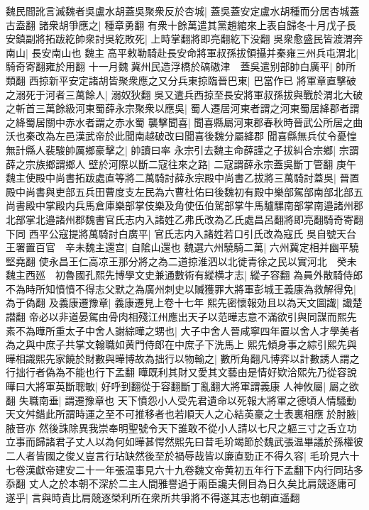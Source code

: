 魏民間訛言滅魏者吳盧水胡蓋吳聚衆反於杏城|{
	蓋吳蓋安定盧水胡種而分居杏城蓋古盍翻}
諸衆胡爭應之|{
	種章勇翻}
有衆十餘萬遣其黨趙綰來上表自歸冬十月戊子長安鎮副將拓跋紇帥衆討吳紇敗死|{
	上時掌翻將即亮翻紇下没翻}
吳衆愈盛民皆渡渭奔南山|{
	長安南山也}
魏主高平敕勒騎赴長安命將軍叔孫拔領攝并秦雍三州兵屯渭北|{
	騎奇寄翻雍於用翻}
十一月魏冀州民造浮橋於碻磝津　蓋吳遣别部帥白廣平|{
	帥所類翻}
西掠新平安定諸胡皆聚衆應之又分兵東掠臨晉巴東|{
	巴當作已}
將軍章直擊破之溺死于河者三萬餘人|{
	溺奴狄翻}
吳又遣兵西掠至長安將軍叔孫拔與戰於渭北大破之斬首三萬餘級河東蜀薛永宗聚衆以應吳|{
	蜀人遷居河東者謂之河東蜀居絳郡者謂之絳蜀居關中赤水者謂之赤水蜀}
襲擊聞喜|{
	聞喜縣屬河東郡春秋時晉武公所居之曲沃也秦改為左邑漢武帝於此聞南越破改曰聞喜後魏分屬絳郡}
聞喜縣無兵仗令憂惶無計縣人裴駿帥厲鄉豪擊之|{
	帥讀曰率}
永宗引去魏主命薛謹之子拔糾合宗鄉|{
	宗謂薛之宗族鄉謂鄉人}
壁於河際以斷二寇往來之路|{
	二寇謂薛永宗蓋吳斷丁管翻}
庚午魏主使殿中尚書拓跋處直等將二萬騎討薛永宗殿中尚書乙拔將三萬騎討蓋吳|{
	晉置殿中尚書與吏部五兵田曹度支左民為六曹杜佑曰後魏初有殿中樂部駕部南部北部五尚書殿中掌殿内兵馬倉庫樂部掌伎樂及角使伍伯駕部掌牛馬驢騾南部掌南邉諸州郡北部掌北邉諸州郡魏書官氏志内入諸姓乙弗氏改為乙氏處昌呂翻將即亮翻騎奇寄翻下同}
西平公寇提將萬騎討白廣平|{
	官氏志内入諸姓若口引氏改為寇氏}
吳自號天台王署置百官　辛未魏主還宫|{
	自隂山還也}
魏選六州驍騎二萬|{
	六州冀定相并幽平驍堅堯翻}
使永昌王仁高凉王那分將之為二道掠淮泗以北徙青徐之民以實河北　癸未魏主西廵　初魯國孔熙先博學文史兼通數術有縱横才志|{
	縱子容翻}
為員外散騎侍郎不為時所知憤憤不得志父默之為廣州刺史以贓獲罪大將軍彭城王義康為救解得免|{
	為于偽翻}
及義康遷豫章|{
	義康遷見上卷十七年}
熙先密懷報効且以為天文圖䜟|{
	䜟楚譛翻}
帝必以非道晏駕由骨肉相殘江州應出天子以范曄志意不滿欲引與同謀而熙先素不為曄所重太子中舍人謝綜曄之甥也|{
	大子中舍人晉咸寧四年置以舍人才學美者為之與中庶子共掌文翰職如黄門侍郎在中庶子下洗馬上}
熙先傾身事之綜引熙先與曄相識熙先家饒於財數與曄博故為拙行以物輸之|{
	數所角翻凡博弈以計數誘人謂之行拙行者偽為不能也行下孟翻}
曄既利其財又愛其文藝由是情好欵洽熙先乃從容說曄曰大將軍英斷聰敏|{
	好呼到翻從于容翻斷丁亂翻大將軍謂義康}
人神攸屬|{
	屬之欲翻}
失職南垂|{
	謂遷豫章也}
天下憤怨小人受先君遺命以死報大將軍之德頃人情騷動天文舛錯此所謂時運之至不可推移者也若順天人之心結英豪之士表裏相應於肘腋|{
	腋音亦}
然後誅除異我崇奉明聖號令天下誰敢不從小人請以七尺之軀三寸之舌立功立事而歸諸君子丈人以為何如曄甚愕然熙先曰昔毛玠竭節於魏武張温畢議於孫權彼二人者皆國之俊乂豈言行玷缺然後至於禍辱哉皆以廉直勁正不得久容|{
	毛玠見六十七卷漢獻帝建安二十一年張温事見六十九卷魏文帝黄初五年行下孟翻下内行同玷多忝翻}
丈人之於本朝不深於二主人間雅譽過于兩臣讒夫側目為日久矣比肩競逐庸可遂乎|{
	言與時貴比肩競逐榮利所在衆所共爭將不得遂其志也朝直遥翻}
